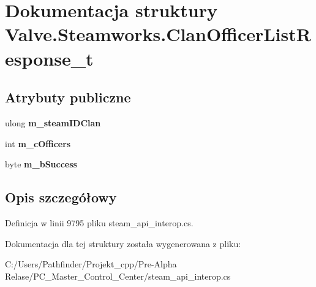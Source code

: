 \hypertarget{struct_valve_1_1_steamworks_1_1_clan_officer_list_response__t}{}\section{Dokumentacja struktury Valve.\+Steamworks.\+Clan\+Officer\+List\+Response\+\_\+t}
\label{struct_valve_1_1_steamworks_1_1_clan_officer_list_response__t}
\subsection*{Atrybuty publiczne}
\begin{DoxyCompactItemize}
\item 
\mbox{\label{struct_valve_1_1_steamworks_1_1_clan_officer_list_response__t_a685ebfc460ca85b69e0acd231b4d9062}} 
ulong {\bfseries m\+\_\+steam\+I\+D\+Clan}
\item 
\mbox{\label{struct_valve_1_1_steamworks_1_1_clan_officer_list_response__t_a2a7f090ae0fcfc4fa9bba135976dee3e}} 
int {\bfseries m\+\_\+c\+Officers}
\item 
\mbox{\label{struct_valve_1_1_steamworks_1_1_clan_officer_list_response__t_a443eefd62c3e6b1fe1e94caf4fc3ee89}} 
byte {\bfseries m\+\_\+b\+Success}
\end{DoxyCompactItemize}


\subsection{Opis szczegółowy}


Definicja w linii 9795 pliku steam\+\_\+api\+\_\+interop.\+cs.



Dokumentacja dla tej struktury została wygenerowana z pliku\+:\begin{DoxyCompactItemize}
\item 
C\+:/\+Users/\+Pathfinder/\+Projekt\+\_\+cpp/\+Pre-\/\+Alpha Relase/\+P\+C\+\_\+\+Master\+\_\+\+Control\+\_\+\+Center/steam\+\_\+api\+\_\+interop.\+cs\end{DoxyCompactItemize}

